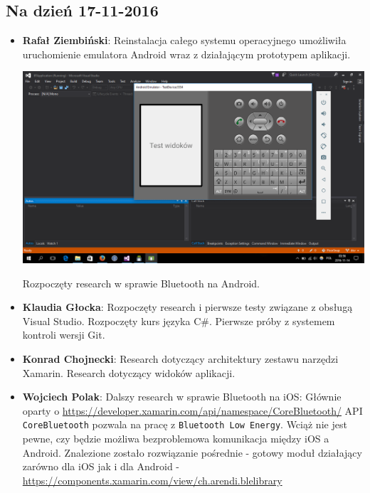 \documentclass[a4paper, titlepage]{article}
\begin{document}
\subsection{Na dzień 17-11-2016}
\label{sec:org3798f77}
\begin{itemize}
\item \textbf{Rafał Ziembiński}:
Reinstalacja całego systemu operacyjnego umożliwiła uruchomienie emulatora Android wraz z działającym prototypem aplikacji.
\begin{center}
\includegraphics[width=.9\linewidth]{./emulator.png}
\end{center}
Rozpoczęty research w sprawie Bluetooth na Android.
\item \textbf{Klaudia Głocka}:
Rozpoczęty research i pierwsze testy związane z obsługą Visual Studio.
Rozpoczęty kurs języka C\#.
Pierwsze próby z systemem kontroli wersji Git.
\item \textbf{Konrad Chojnecki}:
Research dotyczący architektury zestawu narzędzi Xamarin.
Research dotyczący widoków aplikacji.
\item \textbf{Wojciech Polak}:
Dalszy research w sprawie Bluetooth na iOS:
Głównie oparty o \url{https://developer.xamarin.com/api/namespace/CoreBluetooth/}
API \texttt{CoreBluetooth} pozwala na pracę z \texttt{Bluetooth Low Energy}.
Wciąż nie jest pewne, czy będzie możliwa bezproblemowa komunikacja między iOS a Android.
Znalezione zostało rozwiązanie pośrednie - gotowy moduł działający zarówno dla iOS jak i dla Android - \url{https://components.xamarin.com/view/ch.arendi.blelibrary}
\end{itemize}
\end{document}
